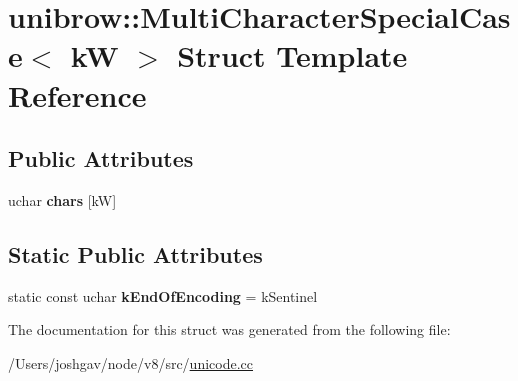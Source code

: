 \hypertarget{structunibrow_1_1_multi_character_special_case}{}\section{unibrow\+:\+:Multi\+Character\+Special\+Case$<$ kW $>$ Struct Template Reference}
\label{structunibrow_1_1_multi_character_special_case}
\subsection*{Public Attributes}
\begin{DoxyCompactItemize}
\item 
uchar {\bfseries chars} \mbox{[}kW\mbox{]}\hypertarget{structunibrow_1_1_multi_character_special_case_aeaffec07906004ca2756c8e5bb2fe712}{}\label{structunibrow_1_1_multi_character_special_case_aeaffec07906004ca2756c8e5bb2fe712}

\end{DoxyCompactItemize}
\subsection*{Static Public Attributes}
\begin{DoxyCompactItemize}
\item 
static const uchar {\bfseries k\+End\+Of\+Encoding} = k\+Sentinel\hypertarget{structunibrow_1_1_multi_character_special_case_a71c9c8ec011c227da047061e12109a28}{}\label{structunibrow_1_1_multi_character_special_case_a71c9c8ec011c227da047061e12109a28}

\end{DoxyCompactItemize}


The documentation for this struct was generated from the following file\+:\begin{DoxyCompactItemize}
\item 
/\+Users/joshgav/node/v8/src/\hyperlink{unicode_8cc}{unicode.\+cc}\end{DoxyCompactItemize}

